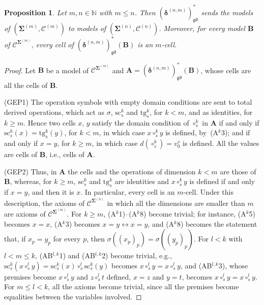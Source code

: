 \documentclass{amsart}
\theoremstyle{plain}
\newtheorem{proposition}[theorem]{Proposition}
\theoremstyle{definition}
\begin{document}
\begin{proposition}\label{PDiscDerivor}
Let $m,n\in\mathbb{N}$ with $m\leq n$. Then $(\boldsymbol{\delta}^{(n,m)})^{\ast}_{\mathfrak{gd}}$ sends the models of $(\mathbf{\Sigma}^{(m)},\mathcal{C}^{(m)})$ to models of $(\mathbf{\Sigma}^{(n)},\mathcal{C}^{(n)})$. Moreover, for every model $\mathbf{B}$ of $\boldsymbol{\mathcal{C}}^{\mathbf{\Sigma}^{(m)}}$, every cell of $(\boldsymbol{\delta}^{(n,m)})^{\ast}_{\mathfrak{gd}}(\mathbf{B})$ is an $m$-cell.
\end{proposition}
\begin{proof}
Let $\mathbf{B}$ be a model of $\boldsymbol{\mathcal{C}}^{\mathbf{\Sigma}^{(m)}}$ and $\mathbf{A}=(\boldsymbol{\delta}^{(n,m)})^{\ast}_{\mathfrak{gd}}(\mathbf{B})$, whose cells are all the cells of $\mathbf{B}$.

(GEP1) The operation symbols with empty domain conditions are sent to total derived operations, which act as $\sigma$, $\mathrm{sc}^{k}_{s}$ and $\mathrm{tg}^{k}_{s}$, for $k<m$, and as identities, for $k\geq m$. Hence two cells $x$, $y$ satisfy the domain condition of $\circ^{k}_{s}$ in $\mathbf{A}$ if and only if $\mathrm{sc}^{k}_{s}(x)=\mathrm{tg}^{k}_{s}(y)$, for $k<m$, in which case $x\circ^{k}_{s}y$ is defined, by~(A$^{k}$3); and if and only if $x=y$, for $k\geq m$, in which case $d(\circ^{k}_{s})=v^{s}_{0}$ is defined. All the values are cells of $\mathbf{B}$, i.e., cells of $\mathbf{A}$.

(GEP2) Thus, in $\mathbf{A}$ the cells and the operations of dimension $k<m$ are those of $\mathbf{B}$, whereas, for $k\geq m$, $\mathrm{sc}^{k}_{s}$ and $\mathrm{tg}^{k}_{s}$ are identities and $x\circ^{k}_{s}y$ is defined if and only if $x=y$, and then it is $x$. In particular, every cell is an $m$-cell. Under this description, the axioms of $\boldsymbol{\mathcal{C}}^{\mathbf{\Sigma}^{(n)}}$ in which all the dimensions are smaller than $m$ are axioms of $\boldsymbol{\mathcal{C}}^{\mathbf{\Sigma}^{(m)}}$. For $k\geq m$, (A$^{k}$1)--(A$^{k}$8) become trivial; for instance, (A$^{k}$5) becomes $x=x$, (A$^{k}$3) becomes $x=y\leftrightarrow x=y$, and (A$^{k}$8) becomes the statement that, if $x_{p}=y_{p}$ for every $p$, then $\sigma((x_{p})_{p})=\sigma((y_{p})_{p})$. For $l<k$ with $l<m\leq k$, (AB$^{l,k}$1) and (AB$^{l,k}$2) become trivial, e.g., $\mathrm{sc}^{k}_{s}(x\circ^{l}_{s}y)=\mathrm{sc}^{k}_{s}(x)\circ^{l}_{s}\mathrm{sc}^{k}_{s}(y)$ becomes $x\circ^{l}_{s}y=x\circ^{l}_{s}y$, and (AB$^{l,k}$3), whose premises become $x\circ^{l}_{s}y$ and $z\circ^{l}_{s}t$ defined, $x=z$ and $y=t$, becomes $x\circ^{l}_{s}y=x\circ^{l}_{s}y$. For $m\leq l<k$, all the axioms become trivial, since all the premises become equalities between the variables involved.
\end{proof}
\end{document}
